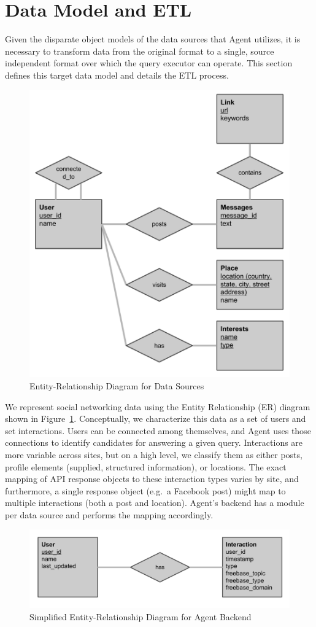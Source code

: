 \section{Data Model and ETL}
\label{sec:data}
Given the disparate object models of the data sources that Agent utilizes, it is
necessary to transform data from the original format to a single, source
independent format over which the query executor can operate. This section
defines this target data model and details the ETL process.

\begin{figure}[!h]
\begin{center}
\includegraphics[width=0.5\linewidth]{figs/er-datasource.pdf}
\caption{Entity-Relationship Diagram for Data Sources}
\label{fig:er-datasource}
\end{center}
\end{figure}

We represent social networking data using the Entity Relationship (ER) diagram
shown in Figure~\ref{fig:er-datasource}. Conceptually, we characterize this data
as a set of users and set interactions. Users can be connected among themselves,
and Agent uses those connections to identify candidates for answering a given
query. Interactions are more variable across sites, but on a high level, we
classify them as either posts, profile elements (supplied, structured
information), or locations. The exact mapping of API response objects to these
interaction types varies by site, and furthermore, a single response object
(e.g.\ a Facebook post) might map to multiple interactions (both a post and
location). Agent's backend has a module per data source and performs the mapping
accordingly.

\begin{figure}[!h]
\begin{center}
\includegraphics[width=0.5\linewidth]{figs/er-agent.pdf}
\caption{Simplified Entity-Relationship Diagram for Agent Backend}
\label{fig:er-agent}
\end{center}
\end{figure}

